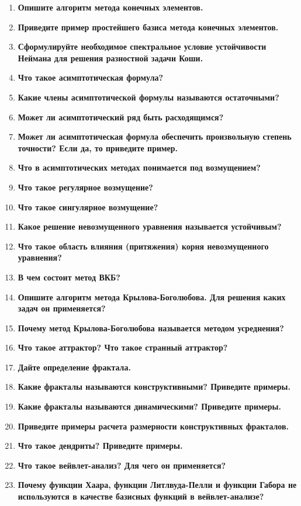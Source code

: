 \begin{enumerate}[label=\textbf{\underline{\arabic*.}}]
\item \textbf{Опишите алгоритм метода конечных элементов.}
\item \textbf{Приведите пример простейшего базиса метода конечных элементов.}
\item \textbf{Сформулируйте необходимое спектральное условие устойчивости Неймана для решения разностной задачи Коши.}
\item \textbf{Что такое асимптотическая формула?}
\item \textbf{Какие члены асимптотической формулы называются остаточными?}
\item \textbf{Может ли асимптотический ряд быть расходящимся?}
\item \textbf{Может ли асимптотическая формула обеспечить произвольную степень точности? Если да, то приведите пример.}
\item \textbf{Что в асимптотических методах понимается под возмущением?}
\item \textbf{Что такое регулярное возмущение?}
\item \textbf{Что такое сингулярное возмущение?}
\item \textbf{Какое решение невозмущенного уравнения называется устойчивым?}
\item \textbf{Что такое область влияния (притяжения) корня невозмущенного уравнения?}
\item \textbf{В чем состоит метод ВКБ?}
\item \textbf{Опишите алгоритм метода Крылова-Боголюбова. Для решения каких задач он применяется?}
\item \textbf{Почему метод Крылова-Боголюбова называется методом усреднения?}
\item \textbf{Что такое аттрактор? Что такое странный аттрактор?}
\item \textbf{Дайте определение фрактала.}
\item \textbf{Какие фракталы называются конструктивными? Приведите примеры.}
\item \textbf{Какие фракталы называются динамическими? Приведите примеры.}
\item \textbf{Приведите примеры расчета размерности конструктивных фракталов.}
\item \textbf{Что такое дендриты? Приведите примеры.}
\item \textbf{Что такое вейвлет-анализ? Для чего он применяется?}
\item \textbf{Почему функции Хаара, функции Литлвуда-Пелли и функции Габора не используются в качестве базисных функций в вейвлет-анализе?}

\end{enumerate}
